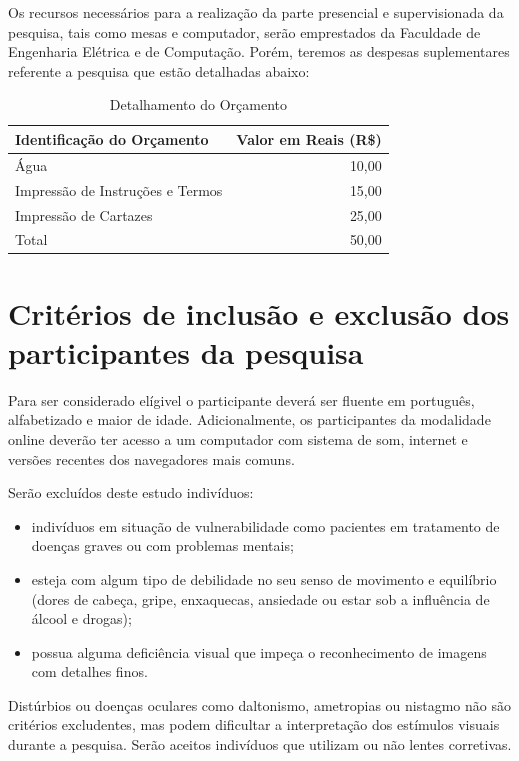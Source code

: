 \documentclass[a4paper,11pt,titlepage,singlespacing]{article}
\begin{document}
Os recursos necessários para a realização da parte presencial e supervisionada da pesquisa, tais como mesas e computador, serão emprestados da Faculdade de Engenharia Elétrica e de Computação. Porém, teremos as despesas suplementares referente a pesquisa que estão detalhadas abaixo:

\begin{table}[h]
\caption{Detalhamento do Orçamento}
\centering
\vspace{0.5cm}
\begin{tabular}{l|r}
Identificação do Orçamento & Valor em Reais (R\$) \\
\hline 
Água        & 10,00 \\
Impressão de Instruções e Termos  & 15,00 \\
Impressão de Cartazes  & 25,00 \\
\hline 
Total & 50,00
\end{tabular}
\end{table}

\section{Critérios de inclusão e exclusão dos participantes da pesquisa}

\noindent Para ser considerado elígivel o participante deverá ser fluente em português, alfabetizado e maior de idade. Adicionalmente, os participantes da modalidade online deverão ter acesso a um computador com sistema de som, internet e versões recentes dos navegadores mais comuns.

Serão excluídos deste estudo indivíduos:

\begin{itemize}
\item indivíduos em situação de vulnerabilidade como pacientes em tratamento de doenças graves ou com problemas mentais;
\item esteja com algum tipo de debilidade no seu senso de movimento e equilíbrio (dores de cabeça, gripe, enxaquecas, ansiedade ou estar sob a influência de álcool e drogas);
\item possua alguma deficiência visual que impeça o reconhecimento de imagens com detalhes finos.
\end{itemize}

Distúrbios ou doenças oculares como daltonismo, ametropias ou nistagmo não são critérios excludentes, mas podem dificultar a interpretação dos estímulos visuais durante a pesquisa. Serão aceitos indivíduos que utilizam ou não lentes corretivas. 
\end{document}
